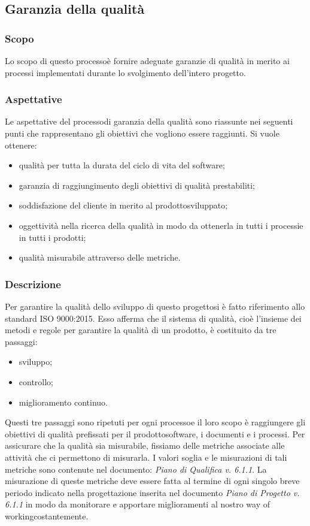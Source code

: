 \subsection{Garanzia della qualità}
\subsubsection{Scopo}
Lo scopo di questo processo\glosp è fornire adeguate garanzie di qualità in merito ai processi implementati durante lo svolgimento dell'intero progetto\glo.
\subsubsection{Aspettative}
Le aspettative del processo\glosp di garanzia della qualità sono riassunte nei seguenti punti che rappresentano gli obiettivi che vogliono essere raggiunti. Si vuole ottenere:
\begin{itemize}
	\item qualità per tutta la durata del ciclo di vita del software;
	\item garanzia di raggiungimento degli obiettivi di qualità prestabiliti;
	\item soddisfazione del cliente in merito al prodotto\glosp sviluppato;
	\item oggettività nella ricerca della qualità in modo da ottenerla in tutti i processi\glosp e in tutti i prodotti\glo;
	\item qualità misurabile attraverso delle metriche\glo.
\end{itemize}
\subsubsection{Descrizione}
Per garantire la qualità dello sviluppo di questo progetto\glosp si è fatto riferimento allo standard ISO 9000:2015. Esso afferma che il sistema di qualità, cioè l'insieme dei metodi e regole per garantire la qualità di un prodotto\glo, è costituito da tre passaggi:
\begin{itemize}
	\item sviluppo;
	\item controllo;
	\item miglioramento continuo.
\end{itemize}
Questi tre passaggi sono ripetuti per ogni processo\glosp e il loro scopo è raggiungere gli obiettivi di qualità prefissati per il prodotto\glosp software, i documenti e i processi.
Per assicurare che la qualità sia misurabile, fissiamo delle metriche associate alle attività che ci permettono di misurarla. I valori soglia e le misurazioni di tali metriche sono contenute nel documento: \textit{Piano di Qualifica v. 6.1.1}.
La misurazione di queste metriche deve essere fatta al termine di ogni singolo breve periodo indicato nella progettazione inserita nel documento \textit{Piano di Progetto v. 6.1.1} in modo da monitorare e apportare miglioramenti al nostro way of working\glosp costantemente.
